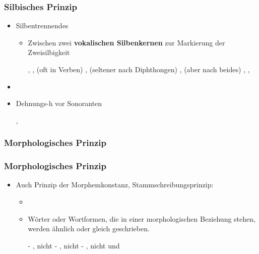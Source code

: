\begin{frame}
\frametitle{Silbisches Prinzip}

\begin{itemize}
	\item Silbentrennendes 
	
	\begin{itemize}
		\item Zwischen zwei \textbf{vokalischen Silbenkernen} \ras zur Markierung der Zweisilbigkeit
		
		
		  \eal
                  \ex {}, , 
		  \ex (oft in Verben) , 
		  \ex (seltener nach Diphthongen) , 
		  \ex (aber nach  beides) , , 
                  \zl
		
	\end{itemize}
	\item[]
	\item Dehnungs-h vor Sonoranten

	  \ea
          , 
          \z

\end{itemize}


\end{frame}


\subsubsection{Morphologisches Prinzip}


\begin{frame}
\frametitle{Morphologisches Prinzip}

\begin{itemize}
	\item Auch Prinzip der Morphemkonstanz, Stammschreibungsprinzip:
	
	\begin{itemize}
		\item[]
		\item Wörter oder Wortformen, die in einer morphologischen Beziehung stehen, werden ähnlich oder gleich geschrieben.
		
		  \eal
                  \ex {} - , nicht 
		  \ex {} - , nicht 
		  \ex {} - , nicht  und 
                  \zl
			 
	\end{itemize}
\end{itemize}


\end{frame}



